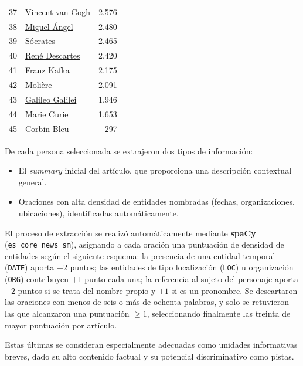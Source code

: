 \documentclass[../main.tex]{subfiles}
\begin{document}
\begin{longtable}{rlr}
37 & \href{https://en.wikipedia.org/wiki/Vincent_van_Gogh}{Vincent van Gogh} & 2.576 \\
38 & \href{https://en.wikipedia.org/wiki/Michelangelo}{Miguel Ángel} & 2.480 \\
39 & \href{https://en.wikipedia.org/wiki/Socrates}{Sócrates} & 2.465 \\
40 & \href{https://en.wikipedia.org/wiki/Ren\%C3\%A9_Descartes}{René Descartes} & 2.420 \\
41 & \href{https://en.wikipedia.org/wiki/Franz_Kafka}{Franz Kafka} & 2.175 \\
42 & \href{https://en.wikipedia.org/wiki/Moli\%C3\%A8re}{Molière} & 2.091 \\
43 & \href{https://en.wikipedia.org/wiki/Galileo_Galilei}{Galileo Galilei} & 1.946 \\
44 & \href{https://en.wikipedia.org/wiki/Marie_Curie}{Marie Curie} & 1.653 \\
45 & \href{https://en.wikipedia.org/wiki/Corbin_Bleu}{Corbin Bleu} & 297 \\
\end{longtable}

De cada persona seleccionada se extrajeron dos tipos de información:

\begin{itemize}
    \item El \textit{summary} inicial del artículo, que proporciona una descripción contextual general.
    \item Oraciones con alta densidad de entidades nombradas (fechas, organizaciones, ubicaciones), identificadas automáticamente.
\end{itemize}

El proceso de extracción se realizó automáticamente mediante \textbf{spaCy} (\texttt{es\_core\_news\_sm}), asignando a cada oración una puntuación de densidad de entidades según el siguiente esquema: la presencia de una entidad temporal (\texttt{DATE}) aporta $+2$ puntos; las entidades de tipo localización (\texttt{LOC}) u organización (\texttt{ORG}) contribuyen $+1$ punto cada una; la referencia al sujeto del personaje aporta $+2$ puntos si se trata del nombre propio y $+1$ si es un pronombre. Se descartaron las oraciones con menos de seis o más de ochenta palabras, y solo se retuvieron las que alcanzaron una puntuación $\geq 1$, seleccionando finalmente las treinta de mayor puntuación por artículo.

Estas últimas se consideran especialmente adecuadas como unidades informativas breves, dado su alto contenido factual y su potencial discriminativo como pistas.
\end{document}
